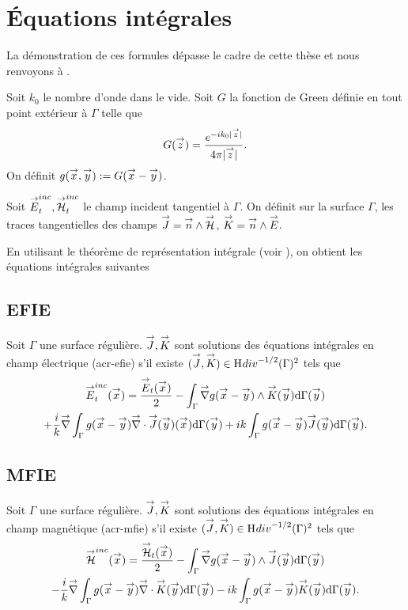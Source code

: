 \section{Équations intégrales}

    La démonstration de ces formules dépasse le cadre de cette thèse et nous renvoyons à \cite[\textsection~5.6]{nedelec_mixed_1980}.

    Soit \(k_0\) le nombre d'onde dans le vide. Soit \(G\) la fonction de Green définie en tout point extérieur à \(\Gamma\) telle que
    \begin{equation*}
      G(\vz) = \frac{e^{-ik_0|\vz|}}{4\pi|\vz|}.
    \end{equation*}
    On définit \(g(\vx,\vy) := G(\vx - \vy)\).

    Soit \(\vE^{inc}_t,\vH^{inc}_t\) le champ incident tangentiel à \(\Gamma\). On définit sur la surface \(\Gamma\), les traces tangentielles des champs \(\vJ = \vn \pvect \vH\), \(\vK = \vn \pvect \vE\).

    En utilisant le théorème de représentation intégrale (voir \cite[Théorème 5.5.1]{nedelec_acoustic_2001}), on obtient les équations intégrales suivantes
    \subsection{EFIE}

      \begin{prop}
        \label{eq:form_int:EFIE}
        Soit \(\Gamma\) une surface régulière.
        \(\vJ,\vK\) sont solutions des équations intégrales en champ électrique (\gls{acr-efie}) s'il existe \((\vJ,\vK) \in \Hdiv^{-1/2}(\Gamma)^2\) tels que
        \begin{multline*}
          \vE^{inc}_t(\vx) =
            \frac{\vE_t(\vx)}{2}
              - \int_{\Gamma} \vgrad g(\vx - \vy) \pvect \vK(\vy) \dd{\Gamma}(\vy) \\
            + \frac{i}{k}\vgrad \int_{\Gamma}  g(\vx - \vy)\vdiv\vJ(\vy)(\vx) \dd{\Gamma}(\vy)
              +  ik\int_{\Gamma} g(\vx - \vy)\vJ(\vy) \dd{\Gamma}(\vy).
        \end{multline*}
      \end{prop}


    \subsection{MFIE}
      \begin{prop}
        \label{eq:form_int:MFIE}
        Soit \(\Gamma\) une surface régulière.
        \(\vJ,\vK\) sont solutions des équations intégrales en champ magnétique (\gls{acr-mfie}) s'il existe \((\vJ,\vK) \in \Hdiv^{-1/2}(\Gamma)^2\) tels que
        \begin{multline*}
          \vH^{inc}(\vx) =
          \frac{\vH_t(\vx)}{2}
            - \int_{\Gamma} \vgrad g(\vx - \vy) \pvect \vJ(\vy) \dd{\Gamma}(\vy) \\
          - \frac{i}{k} \vgrad \int_{\Gamma}  g(\vx - \vy)\vdiv\vK(\vy)\dd{\Gamma}(\vy)
            - ik \int_{\Gamma} g(\vx - \vy)\vK(\vy)\dd{\Gamma}(\vy).
        \end{multline*}
      \end{prop}

